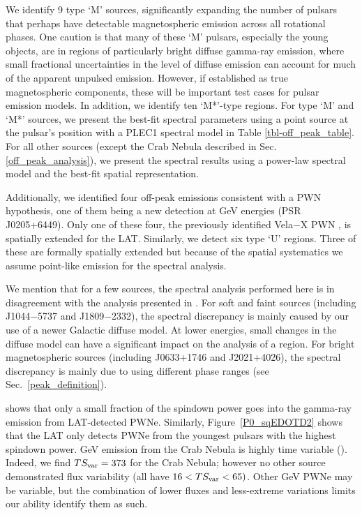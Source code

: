 We identify 9 type `M' sources,
significantly expanding the number of pulsars that perhaps have detectable magnetospheric emission across all rotational phases. 
One caution is that many of these `M' pulsars, especially the young objects, are in regions of particularly bright diffuse gamma-ray
emission, where small fractional uncertainties in the level of diffuse emission can account for much of the apparent unpulsed emission. 
However, if established as true magnetospheric components, these will be important test cases for
pulsar emission models. In addition, we identify ten
`M*'-type regions.
For type `M' and `M*' sources, we present the best-fit spectral parameters using
a point source at the pulsar's position with a PLEC1 spectral model in
Table \ref{tbl-off_peak_table}.  For all other
sources (except the Crab Nebula described in Sec. \ref{off_peak_analysis}), 
we present the spectral results using a power-law spectral
model and the best-fit spatial representation.


Additionally, we identified four off-peak emissions consistent with a PWN
hypothesis, one of them being a new detection at GeV energies (PSR J0205+6449).
Only one of these four, the previously identified Vela$-$X PWN \citep{abdo_2010c_fermi-large}, is spatially extended for the LAT.
Similarly, we detect six type `U' regions. Three of these are formally 
spatially extended
but because of the spatial systematics 
we assume point-like emission for the spectral analysis.

We mention that for a few sources, the spectral analysis
performed here is in disagreement with the analysis presented in
\citet{ackermann_2011a_fermi-lat-search}. For soft and faint sources
(including J1044$-$5737 and J1809$-$2332), the spectral discrepancy is
mainly caused by our use of a newer Galactic diffuse model. At lower
energies, small changes in the diffuse model can have a significant
impact on the analysis of a region.  For bright magnetospheric sources
(including J0633+1746 and J2021+4026), the spectral discrepancy is mainly
due to using different phase ranges (see Sec.~\ref{peak_definition}).


 shows that only
a small fraction of the spindown power goes into 
the gamma-ray emission from LAT-detected PWNe.
Similarly, 
Figure~\ref{P0_sqEDOTD2} shows that the LAT only detects
PWNe from the youngest pulsars with the highest spindown power.
GeV emission from the Crab Nebula is highly time variable ().  
Indeed, we find
$TS_{\rm var}=373$ for the Crab Nebula; however
no other source demonstrated flux variability (all have $16 <TS_{\rm var} <65)$.  
Other GeV PWNe may be variable, but the combination of lower fluxes
and less-extreme variations limits our ability identify them as such.



